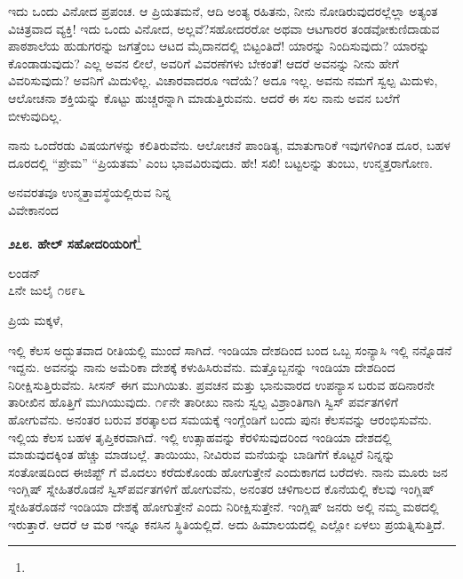 ಇದು ಒಂದು ವಿನೋದ ಪ್ರಪಂಚ. ಆ ಪ್ರಿಯತಮನೆ, ಆದಿ ಅಂತ್ಯ ರಹಿತನು, ನೀನು ನೋಡಿರುವುದರಲ್ಲೆಲ್ಲಾ ಅತ್ಯಂತ ವಿಚಿತ್ರವಾದ ವ್ಯಕ್ತಿ! ಇದು ಒಂದು ವಿನೋದ, ಅಲ್ಲವೆ?ಸಹೋದರರೋ ಅಥವಾ ಆಟಗಾರರ ತಂಡವೋ\enginline{-}ಕುಣಿದಾಡುವ ಪಾಠಶಾಲೆಯ ಹುಡುಗರನ್ನು ಜಗತ್ತೆಂಬ ಆಟದ ಮೈದಾನದಲ್ಲಿ ಬಿಟ್ಟಂತಿದೆ! ಯಾರನ್ನು ನಿಂದಿಸುವುದು? ಯಾರನ್ನು ಕೊಂಡಾಡುವುದು? ಎಲ್ಲ ಅವನ ಲೀಲೆ, ಅವರಿಗೆ ವಿವರಣೆಗಳು ಬೇಕಂತೆ! ಆದರೆ ಅವನನ್ನು ನೀನು ಹೇಗೆ ವಿವರಿಸುವುದು? ಅವನಿಗೆ ಮಿದುಳಿಲ್ಲ. ವಿಚಾರವಾದರೂ ಇದೆಯೆ? ಅದೂ ಇಲ್ಲ. ಅವನು ನಮಗೆ ಸ್ವಲ್ಪ ಮಿದುಳು, ಆಲೋಚನಾ ಶಕ್ತಿಯನ್ನು ಕೊಟ್ಟು ಹುಚ್ಚರನ್ನಾಗಿ ಮಾಡುತ್ತಿರುವನು. ಆದರೆ ಈ ಸಲ ನಾನು ಅವನ ಬಲೆಗೆ ಬೀಳುವುದಿಲ್ಲ.

\vspace{0.2cm}

ನಾನು ಒಂದೆರಡು ವಿಷಯಗಳನ್ನು ಕಲಿತಿರುವೆನು. ಆಲೋಚನೆ ಪಾಂಡಿತ್ಯ, ಮಾತುಗಾರಿಕೆ ಇವುಗಳಿಗಿಂತ ದೂರ, ಬಹಳ ದೂರದಲ್ಲಿ ``ಪ್ರೇಮ'' ``ಪ್ರಿಯತಮ' ಎಂಬ ಭಾವವಿರುವುದು. ಹೇ! ಸಖಿ! ಬಟ್ಟಲನ್ನು ತುಂಬು, ಉನ್ಮತ್ತರಾಗೋಣ.

{\flushright
ಅನವರತವೂ ಉನ್ಮತ್ತಾವಸ್ಥೆಯಲ್ಲಿರುವ ನಿನ್ನ\\ವಿವೇಕಾನಂದ\par}

\newpage

\begin{center}
\textbf{೨೭೮. ಹೇಲ್ ಸಹೋದರಿಯರಿಗೆ}\footnote{}
\end{center}

\vspace{-0.5cm}

\begin{flushright}
ಲಂಡನ್\\೭ನೇ ಜುಲೈ ೧೮೯೬
\end{flushright}

\vspace{-0.5cm}

\noindent
ಪ್ರಿಯ ಮಕ್ಕಳೆ,

ಇಲ್ಲಿ ಕೆಲಸ ಅದ್ಭುತವಾದ ರೀತಿಯಲ್ಲಿ ಮುಂದೆ ಸಾಗಿದೆ. ಇಂಡಿಯಾ ದೇಶದಿಂದ ಬಂದ ಒಬ್ಬ ಸಂನ್ಯಾಸಿ ಇಲ್ಲಿ ನನ್ನೊಡನೆ ಇದ್ದನು. ಅವನನ್ನು ನಾನು ಅಮೆರಿಕಾ ದೇಶಕ್ಕೆ ಕಳುಹಿಸಿರುವೆನು. ಮತ್ತೊಬ್ಬನನ್ನು ಇಂಡಿಯಾ ದೇಶದಿಂದ ನಿರೀಕ್ಷಿಸುತ್ತಿರುವೆನು. ಸೀಸನ್ ಈಗ ಮುಗಿಯಿತು. ಪ್ರವಚನ ಮತ್ತು ಭಾನುವಾರದ ಉಪನ್ಯಾಸ ಬರುವ ಹದಿನಾರನೇ ತಾರೀಖಿನ ಹೊತ್ತಿಗೆ ಮುಗಿಯುವುದು. ೧೯ನೇ ತಾರೀಖು ನಾನು ಸ್ವಲ್ಪ ವಿಶ್ರಾಂತಿಗಾಗಿ ಸ್ವಿಸ್ ಪರ್ವತಗಳಿಗೆ ಹೋಗುವೆನು. ಅನಂತರ ಬರುವ ಶರತ್ಕಾಲದ ಸಮಯಕ್ಕೆ ಇಂಗ್ಲೆಂಡಿಗೆ ಬಂದು ಪುನಃ ಕೆಲಸವನ್ನು ಆರಂಭಿಸುವೆನು. ಇಲ್ಲಿಯ ಕೆಲಸ ಬಹಳ ತೃಪ್ತಿಕರವಾಗಿದೆ. ಇಲ್ಲಿ ಉತ್ಸಾಹವನ್ನು ಕೆರಳಿಸುವುದರಿಂದ ಇಂಡಿಯಾ ದೇಶದಲ್ಲಿ ಮಾಡುವುದಕ್ಕಿಂತ ಹೆಚ್ಚು ಮಾಡಬಲ್ಲೆ. ತಾಯಿಯು, ನೀವಿರುವ ಮನೆಯನ್ನು ಬಾಡಿಗೆಗೆ ಕೊಟ್ಟರೆ ನಿನ್ನನ್ನು ಸಂತೋಷದಿಂದ ಈಜಿಪ್ಟ್ ಗೆ ಮೊದಲು ಕರೆದುಕೊಂಡು ಹೋಗುತ್ತೇನೆ ಎಂದುಕಾಗದ ಬರೆದಳು. ನಾನು ಮೂರು ಜನ ಇಂಗ್ಲಿಷ್ ಸ್ನೇಹಿತರೊಡನೆ ಸ್ವಿಸ್‌ಪರ್ವತಗಳಿಗೆ ಹೋಗುವೆನು, ಅನಂತರ ಚಳಿಗಾಲದ ಕೊನೆಯಲ್ಲಿ ಕೆಲವು ಇಂಗ್ಲಿಷ್ ಸ್ನೇಹಿತರೊಡನೆ ಇಂಡಿಯಾ ದೇಶಕ್ಕೆ ಹೋಗುತ್ತೇನೆ ಎಂದು ನಿರೀಕ್ಷಿಸುತ್ತೇನೆ. ಇಂಗ್ಲಿಷ್ ಜನರು ಅಲ್ಲಿ ನಮ್ಮ ಮಠದಲ್ಲಿ ಇರುತ್ತಾರೆ. ಆದರೆ ಆ ಮಠ ಇನ್ನೂ ಕನಸಿನ ಸ್ಥಿತಿಯಲ್ಲಿದೆ. ಅದು ಹಿಮಾಲಯದಲ್ಲಿ ಎಲ್ಲೋ ಏಳಲು ಪ್ರಯತ್ನಿಸುತ್ತಿದೆ.


